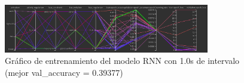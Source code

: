 \begin{figure}[H]
    \centering
    \includegraphics[width=0.8\textwidth]{Imagenes/Bitmap/tb-rnn-1.0.png}
    \caption{Gráfico de entrenamiento del modelo RNN con 1.0s de intervalo (mejor val\_accuracy = 0.39377)}
    \label{fig:rnn-1.0-grafico}
\end{figure}